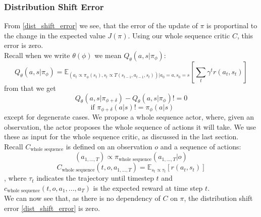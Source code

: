 \subsubsection{Distribution Shift Error}
\label{dist_shift_error_section}
From \ref{dist_shift_error} we see, that the error of the update of $\pi$ is proportinal to the change in the 
expected value $J(\pi)$. Using our whole sequence critic $C$, this error is zero. \\ 


Recall when we write $\theta(\phi)$ we mean $Q_{\theta}(a,s|\pi_{\phi})$:
\begin{equation*}
    Q_{\theta}(a,s|\pi_{\phi}) = \mathbb{E}_{(a_t \propto \pi_{\phi}(s_t), s_t \propto T(s_{t-1}, a_{t-1}, s_t))|a_0=a, s_0=s}\left[\sum_t \gamma^t r(a_t, s_t)\right]
\end{equation*}
from that we get
\begin{equation}
    Q_{\theta }(a,s|\pi_{\phi + \delta}) - Q_{\theta}(a,s|\pi_{\phi}) != 0 
\end{equation}
\begin{equation*}
    \text{ if } \pi_{\phi + \delta}(a|s) != \pi_{\phi}(a|s)
\end{equation*}
except for degenerate cases. We propose a whole sequence actor, where, given an observation, the actor proposes the whole sequence of actions it will 
take. We use these as input for the whole sequence critic, as discussed in the last section. 
Recall $C_{\text{whole sequence}}$ is defined on an observation $o$ and a 
sequence of actions: 
\begin{equation}
    (a_{1,...,T}) \propto \pi_{\text{whole sequence}}(a_{1,...,T}|o)
\end{equation}
\begin{equation*}
    C_{\text{whole sequence}}(t, o, a_{1,...,T}) = \mathbb{E}_{s_t \propto \tau_t}\left[r(a_t, s_t)\right]
\end{equation*}
, where $\tau_t$ indicates the trajectory until timestep $t$ and $c_{\text{whole sequence}}(t, o, a_1, ..., a_T)$ is the expected reward at time step $t$. \\
We can now see that, as there is no dependency of $C$ on $\pi$, the distribution shift error \ref{dist_shift_error} is zero. 

